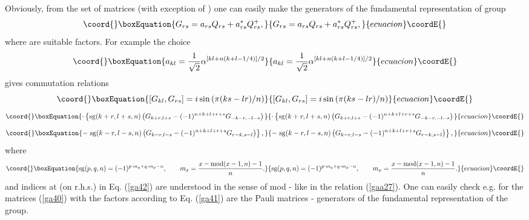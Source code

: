\documentclass[a4paper,a4paper]{article}
\begin{document}
Obviously, from the set of matrices \coordHE{} (with exception of \coordHE{})
one can easily make the \coordHE{} generators of the fundamental
representation of \coordHE{} group 
\begin{equation}\coord{}\boxEquation{
G_{rs}=a_{rs}Q_{rs}+a_{rs}^{\ast }Q_{rs}^{+},  \label{ga40}
}{
G_{rs}=a_{rs}Q_{rs}+a_{rs}^{\ast }Q_{rs}^{+},  }{ecuacion}\coordE{}\end{equation}%
where \coordHE{} are suitable factors. For example the choice 
\begin{equation}\coord{}\boxEquation{
a_{kl}=\frac{1}{\sqrt{2}}\alpha ^{\lbrack kl+n(k+l-1/4)]/2}  \label{ga41}
}{
a_{kl}=\frac{1}{\sqrt{2}}\alpha ^{\lbrack kl+n(k+l-1/4)]/2}  }{ecuacion}\coordE{}\end{equation}%
gives commutation relations%
\begin{equation}\coord{}\boxEquation{
\left[ G_{kl},G_{rs}\right] =i\sin \left( \pi (ks-lr)/n\right)   \label{ga42}
}{
\left[ G_{kl},G_{rs}\right] =i\sin \left( \pi (ks-lr)/n\right)   }{ecuacion}\coordE{}\end{equation}%
\begin{equation*}\coord{}\boxEquation{
\cdot \left\{ \mathrm{sg}(k+r,l+s,n)\left(
G_{k+r,l+s}-(-1)^{n+k+l+r+s}G_{-k-r,-l-s}\right) \right. 
}{
\cdot \left\{ \mathrm{sg}(k+r,l+s,n)\left(
G_{k+r,l+s}-(-1)^{n+k+l+r+s}G_{-k-r,-l-s}\right) \right. 
}{ecuacion}\coordE{}\end{equation*}%
\begin{equation*}\coord{}\boxEquation{
-\left. \mathrm{sg}(k-r,l-s,n)\left(
G_{k-r,l-s}-(-1)^{n+k+l+r+s}G_{r-k,s-l}\right) \right\} ,
}{
-\left. \mathrm{sg}(k-r,l-s,n)\left(
G_{k-r,l-s}-(-1)^{n+k+l+r+s}G_{r-k,s-l}\right) \right\} ,
}{ecuacion}\coordE{}\end{equation*}%
where%
\begin{equation*}\coord{}\boxEquation{
\mathrm{sg}(p,q,n)=(-1)^{p\cdot m_{q}+q\cdot m_{p}-n},\qquad m_{x}=\frac{x-
\text{mod}(x-1,n)-1}{n}.
}{
\mathrm{sg}(p,q,n)=(-1)^{p\cdot m_{q}+q\cdot m_{p}-n},\qquad m_{x}=\frac{x-
\text{mod}(x-1,n)-1}{n}.
}{ecuacion}\coordE{}\end{equation*}%
and indices at \coordHE{} (on r.h.s.) in Eq. (\ref{ga42}) are understood in the
sense of mod - like in the relation (\ref{gaa27}). One can easily check e.g.
for \coordHE{} the matrices (\ref{ga40}) with the factors \coordHE{} according to
Eq. (\ref{ga41}) are the Pauli matrices - generators of the fundamental
representation of the \coordHE{} group.
\end{document}
